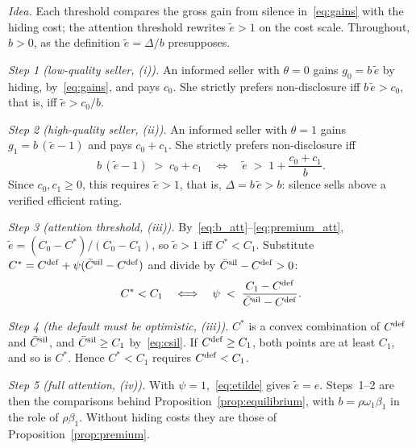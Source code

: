 \upshape
\emph{Idea.} Each threshold compares the gross gain from silence in~\eqref{eq:gains} with the hiding cost; the attention threshold rewrites $\tilde e>1$ on the cost scale. Throughout, $b>0$, as the definition $\tilde e=\Delta/b$ presupposes.

\emph{Step 1 (low-quality seller, (i)).} An informed seller with $\theta=0$ gains $g_0=b\,\tilde e$ by hiding, by~\eqref{eq:gains}, and pays $c_0$. She strictly prefers non-disclosure iff $b\,\tilde e>c_0$, that is, iff $\tilde e>c_0/b$.

\emph{Step 2 (high-quality seller, (ii)).} An informed seller with $\theta=1$ gains $g_1=b\,(\tilde e-1)$ and pays $c_0+c_1$. She strictly prefers non-disclosure iff
\begin{equation*}
    b\,(\tilde e-1)\;>\;c_0+c_1\quad\Longleftrightarrow\quad\tilde e\;>\;1+\frac{c_0+c_1}{b}.
\end{equation*}
Since $c_0,c_1\ge0$, this requires $\tilde e>1$, that is, $\Delta=b\,\tilde e>b$: silence sells above a verified efficient rating.

\emph{Step 3 (attention threshold, (iii)).} By~\eqref{eq:b_att}--\eqref{eq:premium_att}, $\tilde e=(C_0-C^*)/(C_0-C_1)$, so $\tilde e>1$ iff $C^*<C_1$. Substitute $C^*=C^{\rm def}+\psi(\bar C^{\rm sil}-C^{\rm def})$ and divide by $\bar C^{\rm sil}-C^{\rm def}>0$:
\begin{equation*}
    C^*<C_1\quad\Longleftrightarrow\quad\psi\;<\;\frac{C_1-C^{\rm def}}{\bar C^{\rm sil}-C^{\rm def}}.
\end{equation*}

\emph{Step 4 (the default must be optimistic, (iii)).} $C^*$ is a convex combination of $C^{\rm def}$ and $\bar C^{\rm sil}$, and $\bar C^{\rm sil}\ge C_1$ by~\eqref{eq:csil}. If $C^{\rm def}\ge C_1$, both points are at least $C_1$, and so is $C^*$. Hence $C^*<C_1$ requires $C^{\rm def}<C_1$.

\emph{Step 5 (full attention, (iv)).} With $\psi=1$,~\eqref{eq:etilde} gives $\tilde e=e$. Steps~1--2 are then the comparisons behind Proposition~\ref{prop:equilibrium}, with $b=\rho\omega_1\beta_1$ in the role of $\rho\beta_1$. Without hiding costs they are those of Proposition~\ref{prop:premium}.
